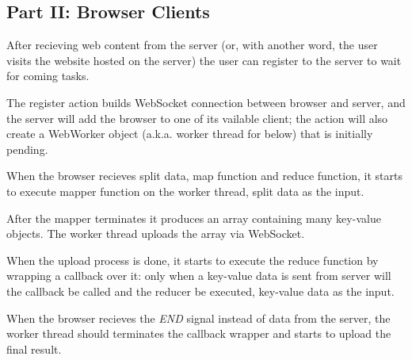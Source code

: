 \subsection{Part II: Browser Clients}

After recieving web content from the server (or, with another word, the user visits the website hosted on the server) the user can register to the server to wait for coming tasks.

The register action builds WebSocket connection between browser and server, and the server will add the browser to one of its vailable client; the action will also create a WebWorker object (a.k.a. worker thread for below) that is initially pending.

When the browser recieves split data, map function and reduce function, it starts to execute mapper function on the worker thread, split data as the input.

After the mapper terminates it produces an array containing many key-value objects. The worker thread uploads the array via WebSocket.

When the upload process is done, it starts to execute the reduce function by wrapping a callback over it: only when a key-value data is sent from server will the callback be called and the reducer be executed, key-value data as the input.

When the browser recieves the \emph{END} signal instead of data from the server, the worker thread should terminates the callback wrapper and starts to upload the final result.